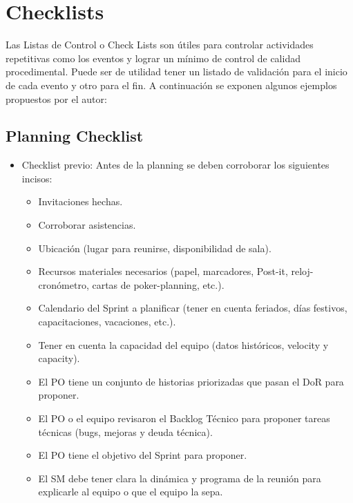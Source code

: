 \newpage
\section{Checklists}

Las Listas de Control o Check Lists son útiles para controlar actividades repetitivas como los eventos y lograr un mínimo de control de calidad procedimental. Puede ser de utilidad tener un listado de validación para el inicio de cada evento y otro para el fin. 
A continuación se exponen algunos ejemplos propuestos por el autor:

\subsection{Planning Checklist}

\begin{itemize}
  
  \item {Checklist previo: Antes de la planning se deben corroborar los siguientes incisos:
  
  \begin{itemize}
    \item Invitaciones hechas.
    \item Corroborar asistencias.
    \item Ubicación (lugar para reunirse, disponibilidad de sala).
    \item Recursos materiales necesarios (papel, marcadores, Post-it, reloj-cronómetro, cartas de poker-planning, etc.).
    \item Calendario del Sprint a planificar (tener en cuenta feriados, días festivos, capacitaciones, vacaciones, etc.).
    \item Tener en cuenta la capacidad del equipo (datos históricos, velocity y capacity).
    \item El PO tiene un conjunto de historias priorizadas que pasan el DoR para proponer.
    \item El PO o el equipo revisaron el Backlog Técnico para proponer tareas técnicas (bugs, mejoras y deuda técnica).
    \item El PO tiene el objetivo del Sprint para proponer.
    \item El SM debe tener clara la dinámica y programa de la reunión para explicarle al equipo o que el equipo la sepa.
  \end{itemize}
  }
  

\end{itemize}
